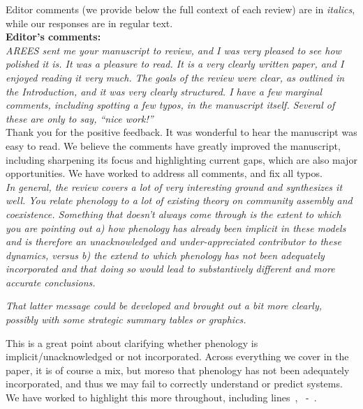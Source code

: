 \documentclass[11pt]{article}
\newcommand{\lr}[1]{~\lineref{#1}}
\begin{document}
\setlength{\parindent}{0cm}
\setlength{\parskip}{5pt}

Editor comments (we provide below the full context of each review) are in \emph{italics}, while our responses are in regular text. \\ 

{\bf Editor's comments:} \\

\emph{AREES sent me your manuscript to review, and I was very pleased to see how polished it is. It was a pleasure to read.
It is a very clearly written paper, and I enjoyed reading it very much. The goals of the review were clear, as outlined in the Introduction, and it was very clearly structured. I have a few marginal comments, including spotting a few typos, in the manuscript itself. Several of these are only to say, ``nice work!''}\\

Thank you for the positive feedback. It was wonderful to hear the manuscript was easy to read. We believe the comments have greatly improved the manuscript, including sharpening its focus and highlighting current gaps, which are also major opportunities. We have worked to address all comments, and fix all typos. \\

\emph{In general, the review covers a lot of very interesting ground and synthesizes it well. You relate phenology to a lot of existing theory on community assembly and coexistence. Something that doesn’t always come through is the extent to which you are pointing out a) how phenology has already been implicit in these models and is therefore an unacknowledged and under-appreciated contributor to these dynamics, versus b) the extend to which phenology has not been adequately incorporated and that doing so would lead to substantively different and more accurate conclusions.}

\emph{That latter message could be developed and brought out a bit more clearly, possibly with some strategic summary tables or graphics.}

This is a great point about clarifying whether phenology is implicit/unacknowledged or not incorporated. Across everything we cover in the paper, it is of course a mix, but moreso that phenology has not been adequately incorporated, and thus we may fail to correctly understand or predict systems. We have worked to highlight this more throughout, including lines\lr{notincluded1S}, \lr{notincluded2S}-\lr{notincluded2E}. \\
\end{document}
